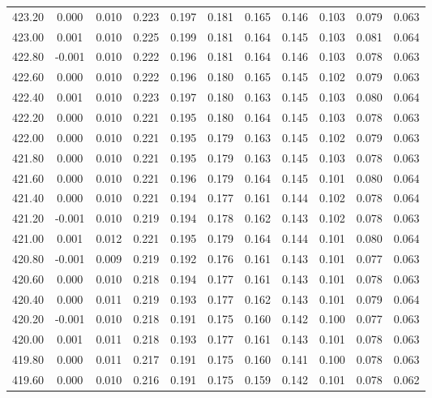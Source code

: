 \begin{longtable}{cccccccccc}
    423.20 &  0.000 &  0.010 &  0.223 &  0.197 &  0.181 &  0.165 &  0.146 &  0.103 &  0.079 &  0.063 \\
    423.00 &  0.001 &  0.010 &  0.225 &  0.199 &  0.181 &  0.164 &  0.145 &  0.103 &  0.081 &  0.064 \\
    422.80 & -0.001 &  0.010 &  0.222 &  0.196 &  0.181 &  0.164 &  0.146 &  0.103 &  0.078 &  0.063 \\
    422.60 &  0.000 &  0.010 &  0.222 &  0.196 &  0.180 &  0.165 &  0.145 &  0.102 &  0.079 &  0.063 \\
    422.40 &  0.001 &  0.010 &  0.223 &  0.197 &  0.180 &  0.163 &  0.145 &  0.103 &  0.080 &  0.064 \\
    422.20 &  0.000 &  0.010 &  0.221 &  0.195 &  0.180 &  0.164 &  0.145 &  0.103 &  0.078 &  0.063 \\
    422.00 &  0.000 &  0.010 &  0.221 &  0.195 &  0.179 &  0.163 &  0.145 &  0.102 &  0.079 &  0.063 \\
    421.80 &  0.000 &  0.010 &  0.221 &  0.195 &  0.179 &  0.163 &  0.145 &  0.103 &  0.078 &  0.063 \\
    421.60 &  0.000 &  0.010 &  0.221 &  0.196 &  0.179 &  0.164 &  0.145 &  0.101 &  0.080 &  0.064 \\
    421.40 &  0.000 &  0.010 &  0.221 &  0.194 &  0.177 &  0.161 &  0.144 &  0.102 &  0.078 &  0.064 \\
    421.20 & -0.001 &  0.010 &  0.219 &  0.194 &  0.178 &  0.162 &  0.143 &  0.102 &  0.078 &  0.063 \\
    421.00 &  0.001 &  0.012 &  0.221 &  0.195 &  0.179 &  0.164 &  0.144 &  0.101 &  0.080 &  0.064 \\
    420.80 & -0.001 &  0.009 &  0.219 &  0.192 &  0.176 &  0.161 &  0.143 &  0.101 &  0.077 &  0.063 \\
    420.60 &  0.000 &  0.010 &  0.218 &  0.194 &  0.177 &  0.161 &  0.143 &  0.101 &  0.078 &  0.063 \\
    420.40 &  0.000 &  0.011 &  0.219 &  0.193 &  0.177 &  0.162 &  0.143 &  0.101 &  0.079 &  0.064 \\
    420.20 & -0.001 &  0.010 &  0.218 &  0.191 &  0.175 &  0.160 &  0.142 &  0.100 &  0.077 &  0.063 \\
    420.00 &  0.001 &  0.011 &  0.218 &  0.193 &  0.177 &  0.161 &  0.143 &  0.101 &  0.078 &  0.063 \\
    419.80 &  0.000 &  0.011 &  0.217 &  0.191 &  0.175 &  0.160 &  0.141 &  0.100 &  0.078 &  0.063 \\
    419.60 &  0.000 &  0.010 &  0.216 &  0.191 &  0.175 &  0.159 &  0.142 &  0.101 &  0.078 &  0.062 \\

\end{longtable}
